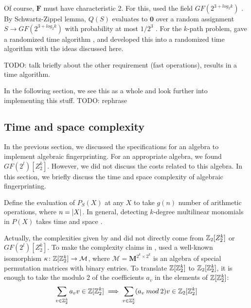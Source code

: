 Of course, $\mathbf{F}$ must have characteristic 2. For this, \citeauthor{Williams09} 
used the field $GF(2^{3+log_2k})$ \cite{Williams09}. By Schwartz-Zippel lemma, $Q(S)$ 
evaluates to $\mathbf{0}$ over a random assignment $S \to GF(2^{3+log_2k})$ with probability 
at most $1/2^3$ \cite{Williams09}. For the $k$-path problem, \citeauthor{Koutis08} 
gave a randomized  time algorithm \cite{Koutis08}, 
and \citeauthor{Williams09} developed this into a randomized  
time algorithm \cite{Williams09} with the ideas discussed here.

TODO: talk briefly about the other requirement (fast operations), 
results in a  time algorithm.

In the following section, we see this as a whole and look further into implementing this stuff. 
TODO: rephrase

\subsection{Time and space complexity}
\label{sect:complexity}

In the previous section, we discussed the specifications for an algebra to 
implement algebraic fingerprinting. For an appropriate algebra, we found 
$GF(2^{l})[Z_2^k]$. However, we did not discuss the costs related 
to this algebra. In this section, we briefly discuss the time and space complexity 
of algebraic fingerprinting.

Define the evaluation of $P_S(X)$ at any $X$ to take $g(n)$ number of  
arithmetic operations, where $n = {\left\vert X\right\vert}$. In general, 
detecting $k$-degree multilinear monomials in $P(X)$ takes 
 time and  space \cite{Williams09}.

Actually, the complexities given by \citeauthor{Koutis08} \cite{Koutis08} and 
\citeauthor{Williams09} \cite{Williams09} did not directly come from 
$\mathbb Z_2[Z_2^k]$ or $GF(2^{l})[Z_2^k]$. 
To make the complexity claims in \cite{Koutis08}, 
\citeauthor{Koutis08} used a well-known \cite{Terras99} isomorphism 
$\kappa \colon \mathbb Z[\mathbb Z_2^k] \to \mathcal{M}$, where $\mathcal{M} = \mathbf{M}^{2^k \times 2^k}$ 
is an algebra of special permutation matrices with binary entries. To translate $\mathbb Z[\mathbb Z_2^k]$ to 
$\mathbb Z_2[\mathbb Z_2^k]$, it is enough to take the modulo 2 of the coefficients $a_v$ in 
the elements of $\mathbb Z[\mathbb Z_2^k]$: 
\[
  \displaystyle \sum_{v \in \mathbb Z_2^k}a_v v \in \mathbb Z[\mathbb Z_2^k] \implies 
  \displaystyle \sum_{v \in \mathbb Z_2^k}(a_v \: mod \: 2) v \in \mathbb Z_2[\mathbb Z_2^k]
\]

